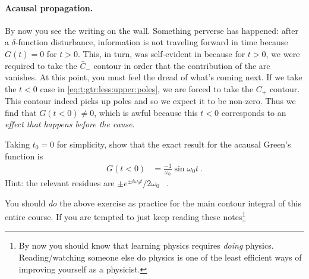 \paragraph{Acausal propagation.} By now you see the writing on the wall. Something perverse has happened: after a $\delta$-function disturbance, information is not traveling forward in time because $G(t)=0$ for $t>0$. This, in turn, was self-evident in because for $t>0$, we were required to take the $\bar C_-$ contour in order that the contribution of the arc vanishes. At this point, you must feel the dread of what's coming next. If we take the $t<0$ case in \eqref{eq:t:gtr:less:upper:poles}, we are forced to take the $C_+$ contour. This contour indeed picks up poles and so we expect it to be non-zero. Thus we find that $G(t<0) \neq 0$, which is awful because this $t<0$ corresponds to an \emph{effect that happens before the cause}. 

\begin{exercise}
Taking $t_0=0$ for simplicity, show that the exact result for the acausal Green's function is
\begin{align}
	G(t<0) &= \frac{-1}{\omega_0}\sin\omega_0t \ .
	\label{eq:HO:G:t:less:0:nonzero}
\end{align}
Hint: the relevant residues are $\pm e^{\pm i\omega_0t}/2\omega_0$ \ .
\end{exercise}
You should \emph{do} the above exercise as practice for the main contour integral of this entire course. If you are tempted to just keep reading these notes\footnote{By now you should know that learning physics requires \emph{doing} physics. Reading/watching someone else do physics is one of the least efficient ways of improving yourself as a physicist.} 

